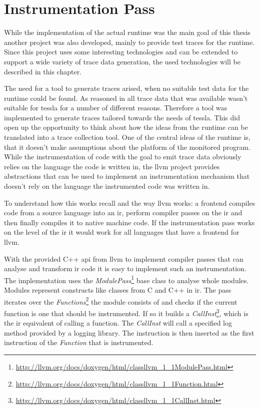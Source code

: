 \section{Instrumentation Pass}
\label{sec:implementation:instrumentation}

While the implementation of the actual runtime was the main goal of this thesis another project was also developed, mainly to provide test traces for the runtime.
Since this project uses some interesting technologies and can be extended to support a wide variety of trace data generation, the used technologies will be described in this chapter.

The need for a tool to generate traces arised, when no suitable test data for the runtime could be found.
As reasoned in  all trace data that was available wasn't suitable for \gls{tessla} for a number of different reasons.
Therefore a tool was implemented to generate traces tailored towards the needs of \gls{tessla}.
This did open up the opportunity to think about how the ideas from the runtime can be translated into a trace collection tool.
One of the central ideas of the runtime is, that it doesn't make assumptions about the platform of the monitored program.
While the instrumentation of code with the goal to emit trace data obviously relies on the language the code is written in, the \gls{llvm} project provides abstractions that can be used to implement an instrumentation mechanism that doesn't rely on the language the instrumented code was written in.

To understand how this works recall  and the way \gls{llvm} works: a frontend compiles code from a source language into an \gls{ir}, perform compiler passes on the \gls{ir} and then finally compiles it to native machine code.
If the instrumentation pass works on the level of the \gls{ir} it would work for all languages that have a frontend for \gls{llvm}.

With the provided C++ \gls{api} from \gls{llvm} to implement compiler passes that can analyse and transform \gls{ir} code it is easy to implement such an instrumentation.
The implementation uses the \emph{ModulePass}\footnote{\url{http://llvm.org/docs/doxygen/html/classllvm_1_1ModulePass.html}} base class to analyse whole modules.
Modules represent constructs like classes from C and C++ in \gls{ir}.
The pass iterates over the \emph{Functions}\footnote{\url{http://llvm.org/docs/doxygen/html/classllvm_1_1Function.html}} the module consists of and checks if the current function is one that should be instrumented.
If so it builds a \emph{CallInst}\footnote{\url{http://llvm.org/docs/doxygen/html/classllvm_1_1CallInst.html}}, which is the \gls{ir} equivalent of calling a function.
The \emph{CallInst} will call a specified log method provided by a logging library.
The instruction is then inserted as the first instruction of the \emph{Function} that is instrumented.

